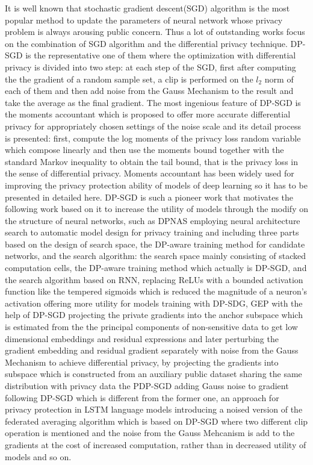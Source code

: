 \documentclass[conference]{IEEEtran}
\begin{document}
It is well known that stochastic gradient descent(SGD) algorithm is the most popular method to update the parameters of neural network whose privacy problem is always arousing public concern. Thus a lot of outstanding works focus on the combination of SGD algorithm and the differential privacy technique. DP-SGD\cite{b15} is the representative one of them where the optimization with differential privacy is divided into two step: at each step of the SGD, first after computing the the gradient of a random sample set, a clip is performed on the $l_2$ norm of each of them and then add noise from the Gauss Mechanism to the result and take the average as the final gradient. The most ingenious feature of DP-SGD is the moments accountant which is proposed to offer more accurate differential privacy for appropriately chosen settings of the noise scale and its detail process is presented: first, compute the log moments of the privacy loss random variable which compose linearly and then use the moments bound together with the standard Markov inequality to obtain the tail bound, that is the privacy loss in the sense of differential privacy. Moments accountant has been widely used for improving the privacy protection ability of models of deep learning so it has to be presented in detailed here. DP-SGD is such a pioneer work that motivates the following work based on it to increase the utility of models through the modify on the structure of neural networks, such as DPNAS employing neural architecture search to automatic model design for privacy training and including three parts based on the design of search space, the DP-aware training method for candidate networks, and the search algorithm: the search space mainly consisting of stacked computation cells, the DP-aware training method which actually is DP-SGD, and the search algorithm based on RNN\cite{b16}, replacing ReLUs with a bounded activation function like the tempered sigmoids\cite{b17} which is reduced the magnitude of a neuron’s activation offering more utility for models training with DP-SDG, GEP\cite{b18} with the help of DP-SGD projecting the private gradients into the anchor subspace which is estimated from the the principal components of non-sensitive data to get low dimensional embeddings and residual expressions and later perturbing the gradient embedding and residual gradient separately with noise from the Gauss Mechanism to achieve differential privacy, by projecting the gradients into subspace which is constructed from an auxiliary public dataset sharing the same distribution with privacy data the PDP-SGD\cite{b19} adding Gauss noise to gradient following DP-SGD which is different from the former one, an approach\cite{b20} for privacy protection in LSTM language models introducing a noised version of the federated averaging algorithm which is based on DP-SGD where two different clip operation is mentioned and the noise from the Gauss Mehcanism is add to the gradients at the cost of increased computation, rather than in decreased utility of models and so on.
\end{document}
